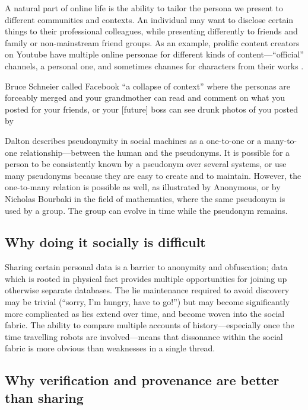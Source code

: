 \documentclass{IOS-Book-Article}     %
\begin{document}
A natural part of online life is the ability to tailor the persona we present to
different communities and contexts. An individual may want to disclose certain
things to their professional colleagues, while presenting differently to friends
and family or non-mainstream friend groups. 
As an example, prolific content creators on Youtube have multiple online
personae for different kinds of content---``official'' channels, a personal one,
and sometimes channes for characters from their works
\cite{guy2014ConstructedIdentity}.

Bruce Schneier called Facebook ``a collapse of context'' where the personas are
forceably merged and your grandmother can read and comment on what you posted
for your friends, or your [future] boss can see drunk photos of you posted by

Dalton describes pseudonymity in social machines\cite{dalton2013Pseudonymity} as
a one-to-one or a many-to-one relationship---between the human and the
pseudonyms. It is possible for a person to be consistently known by a pseudonym
over several systems, or use many pseudonyms because they are easy to create and
to maintain. However, the one-to-many relation is possible as well, as
illustrated by Anonymous, or by Nicholas Bourbaki in the field of mathematics,
where the same pseudonym is used by a group. The group can evolve in time while
the pseudonym remains. 

\subsection{Why doing it socially is difficult}

Sharing certain personal data is a barrier to anonymity and obfuscation; 
data which is rooted in physical fact provides multiple opportunities for
joining up otherwise separate databases. 
The lie maintenance required to avoid discovery may be trivial (``sorry, I’m hungry,
have to go!'') but may become significantly more complicated as lies extend over
time, and become woven into the social fabric. The ability to compare
multiple accounts of history---especially once the time travelling
robots are involved---means that dissonance within the social
fabric is more obvious than weaknesses in a single thread.




\subsection*{Why verification and provenance are better than sharing}
\end{document}
